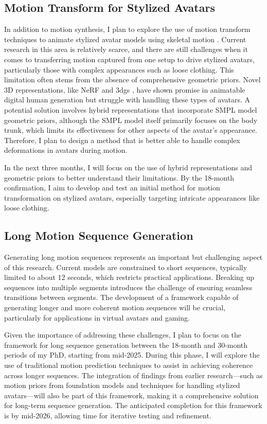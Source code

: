 \documentclass[a4paper, 12pt]{article}
\begin{document}
\subsection{Motion Transform for Stylized Avatars}
In addition to motion synthesis, I plan to explore the use of motion transform techniques to animate stylized avatar models using skeletal motion \cite{li2024animatable, shao2024splattingavatar, svitov2024haha}. Current research in this area is relatively scarce, and there are still challenges when it comes to transferring motion captured from one setup to drive stylized avatars, particularly those with complex appearances such as loose clothing. This limitation often stems from the absence of comprehensive geometric priors. Novel 3D representations, like NeRF \cite{mildenhall2021nerf} and 3dgs \cite{kerbl20233d}, have shown promise in animatable digital human generation but struggle with handling these types of avatars. A potential solution involves hybrid representations that incorporate SMPL \cite{loper2023smpl} model geometric priors, although the SMPL model itself primarily focuses on the body trunk, which limits its effectiveness for other aspects of the avatar's appearance. Therefore, I plan to design a method that is better able to handle complex deformations in avatars during motion.

In the next three months, I will focus on the use of hybrid representations and geometric priors to better understand their limitations. By the 18-month confirmation, I aim to develop and test an initial method for motion transformation on stylized avatars, especially targeting intricate appearances like loose clothing.

\subsection{Long Motion Sequence Generation}
Generating long motion sequences represents an important but challenging aspect of this research. Current models are constrained to short sequences, typically limited to about 12 seconds, which restricts practical applications. Breaking up sequences into multiple segments introduces the challenge of ensuring seamless transitions between segments. The development of a framework capable of generating longer and more coherent motion sequences will be crucial, particularly for applications in virtual avatars and gaming.

Given the importance of addressing these challenges, I plan to focus on the framework for long sequence generation between the 18-month and 30-month periods of my PhD, starting from mid-2025. During this phase, I will explore the use of traditional motion prediction techniques to assist in achieving coherence across longer sequences. The integration of findings from earlier research—such as motion priors from foundation models and techniques for handling stylized avatars—will also be part of this framework, making it a comprehensive solution for long-term sequence generation. The anticipated completion for this framework is by mid-2026, allowing time for iterative testing and refinement.




\end{document}
